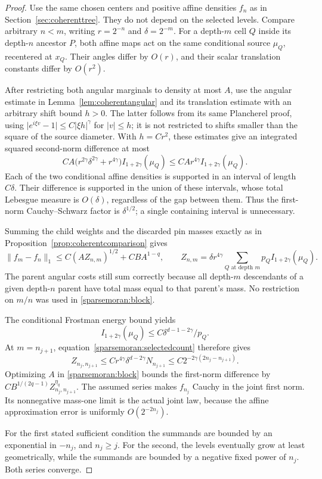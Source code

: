 \begin{proof}
Use the same chosen centers and positive affine densities \(f_n\)
as in Section~\ref{sec:coherenttree}. They do not depend on the
selected levels. Compare arbitrary \(n<m\), writing
\(r=2^{-n}\) and \(\delta=2^{-m}\). For a depth-\(m\) cell \(Q\)
inside its depth-\(n\) ancestor \(P\), both affine maps act on the
same conditional source \(\mu_Q\), recentered at \(x_Q\).
Their angles differ by \(O(r)\), and their scalar translation
constants differ by \(O(r^2)\).

After restricting both angular marginals to density at most \(A\),
use the angular estimate in Lemma~\ref{lem:coherentangular} and its
translation estimate with an arbitrary shift bound \(h>0\).
The latter follows from its same Plancherel proof, using
\(\lvert e^{i\xi v}-1\rvert\le C\lvert\xi h\rvert^\gamma\)
for \(\lvert v\rvert\le h\); it is not restricted to shifts smaller
than the square of the source diameter. With \(h=Cr^2\), these
estimates give an integrated squared
second-norm difference at most
\[
 CA\bigl(r^{2\gamma}\delta^{2\gamma}+r^{4\gamma}\bigr)
 I_{1+2\gamma}(\mu_Q)
 \le CA r^{4\gamma}I_{1+2\gamma}(\mu_Q).
\]
Each of the two conditional affine densities is supported in an
interval of length \(C\delta\). Their difference is supported in
the union of these intervals, whose total Lebesgue measure is
\(O(\delta)\), regardless of the gap between them. Thus the
first-norm Cauchy--Schwarz factor is \(\delta^{1/2}\);
a single containing interval is unnecessary.

Summing the child weights and the discarded pin masses exactly as
in Proposition~\ref{prop:coherentcomparison} gives
\begin{equation}\label{sparsemoran:block}
 \|f_m-f_n\|_1
 \le C(AZ_{n,m})^{1/2}+CBA^{1-q},\qquad
 Z_{n,m}=\delta r^{4\gamma}
       \sum_{Q\text{ at depth }m}p_QI_{1+2\gamma}(\mu_Q).
\end{equation}
The parent angular costs still sum correctly because all depth-\(m\)
descendants of a given depth-\(n\) parent have total mass equal
to that parent's mass. No restriction on \(m/n\) was used in
\eqref{sparsemoran:block}.

The conditional Frostman energy bound yields
\[
 I_{1+2\gamma}(\mu_Q)
 \le C\delta^{d-1-2\gamma}/p_Q.
\]
At \(m=n_{j+1}\), equation~\eqref{sparsemoran:selectedcount} therefore
gives
\[
 Z_{n_j,n_{j+1}}
 \le C r^{4\gamma}\delta^{d-2\gamma}N_{n_{j+1}}
 \le C2^{-2\gamma(2n_j-n_{j+1})}.
\]
Optimizing \(A\) in \eqref{sparsemoran:block} bounds the first-norm
difference by \(C B^{1/(2q-1)}Z_{n_j,n_{j+1}}^{\eta_q}\).
The assumed series makes \(f_{n_j}\) Cauchy in the joint first
norm. Its nonnegative mass-one limit is the actual joint law,
because the affine approximation error is uniformly
\(O(2^{-2n_j})\).

For the first stated sufficient condition the summands are bounded
by an exponential in \(-n_j\), and \(n_j\ge j\).
For the second, the levels eventually grow at least geometrically,
while the summands are bounded by a negative fixed power of \(n_j\).
Both series converge.
\end{proof}

